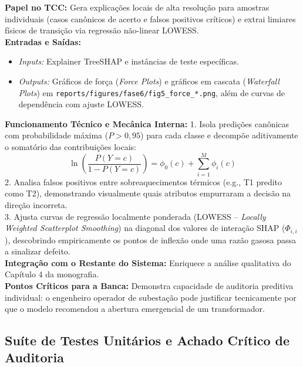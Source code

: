 \documentclass[10pt,a4paper]{article}
\begin{document}
\begin{filebox}
\textbf{Papel no TCC:} Gera explicações locais de alta resolução para amostras individuais (casos canônicos de acerto e falsos positivos críticos) e extrai limiares físicos de transição via regressão não-linear LOWESS.\\
\textbf{Entradas e Saídas:}
\begin{itemize}[leftmargin=*,itemsep=1pt]
  \item \textit{Inputs:} Explainer TreeSHAP e instâncias de teste específicas.
  \item \textit{Outputs:} Gráficos de força (\textit{Force Plots}) e gráficos em cascata (\textit{Waterfall Plots}) em \texttt{reports/figures/fase6/fig5\_force\_*.png}, além de curvas de dependência com ajuste LOWESS.
\end{itemize}
\textbf{Funcionamento Técnico e Mecânica Interna:} 
1. Isola predições canônicas com probabilidade máxima ($P > 0,95$) para cada classe e decompõe aditivamente o somatório das contribuições locais:
   $$\ln\left(\frac{P(Y=c)}{1 - P(Y=c)}\right) = \phi_0(c) + \sum_{i=1}^M \phi_i(c)$$
2. Analisa falsos positivos entre sobreaquecimentos térmicos (e.g., T1 predito como T2), demonstrando visualmente quais atributos empurraram a decisão na direção incorreta.\\
3. Ajusta curvas de regressão localmente ponderada (LOWESS -- \textit{Locally Weighted Scatterplot Smoothing}) na diagonal dos valores de interação SHAP ($\Phi_{i,i}$), descobrindo empiricamente os pontos de inflexão onde uma razão gasosa passa a sinalizar defeito.\\
\textbf{Integração com o Restante do Sistema:} Enriquece a análise qualitativa do Capítulo 4 da monografia.\\
\textbf{Pontos Críticos para a Banca:} Demonstra capacidade de auditoria preditiva individual: o engenheiro operador de subestação pode justificar tecnicamente por que o modelo recomendou a abertura emergencial de um transformador.
\end{filebox}

\subsection{Suíte de Testes Unitários e Achado Crítico de Auditoria}
\end{document}
